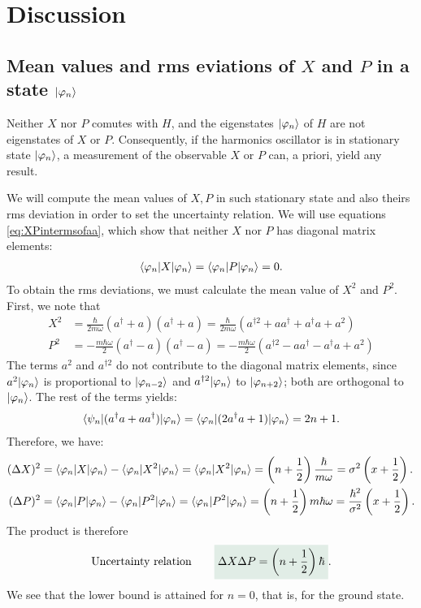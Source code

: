 \section{Discussion}


\subsection{Mean values and rms eviations of $X$ and $P$ in a state $|\varphi_n\rangle$}

Neither $X$ nor $P$ comutes with $H$, and the eigenstates $|\varphi_n\rangle$ of $H$ are not eigenstates of $X$ or $P$. Consequently, if the harmonics oscillator is in stationary state $|\varphi_n\rangle$,
a measurement of the observable $X$ or $P$ can, a priori, yield any result.


We will compute the mean values of $X,P$ in such stationary state and also theirs rms deviation in order to set the uncertainty relation. 
We will use equations \eqref{eq:XPintermsofaa}, which show that neither $X$ nor $P$ has diagonal matrix elements:
\begin{align}
    \langle\varphi_n|X|\varphi_n\rangle=\langle\varphi_n|P|\varphi_n\rangle=0.
\end{align}
To obtain the rms deviations, we must calculate the mean value of $X^2$ and $P^2$. First, we note that 
\begin{align*}
    X^2&=\frac{\hbar}{2m\omega}(a^\dagger+a)(a^\dagger+a)=\frac{\hbar}{2m\omega}(a^{\dagger 2}+aa^\dagger+a^\dagger a+a^2)\\
    P^2&=-\frac{m\hbar\omega}{2}(a^\dagger-a)(a^\dagger-a)=-\frac{m\hbar\omega}{2}(a^{\dagger2}-aa^\dagger-a^\dagger a+a^2)
\end{align*}
The terms $a^2$ and $a^{\dagger2}$ do not contribute to the diagonal matrix elements, since $a^2|\varphi_n\rangle$ is proportional to $|\varphi_{n-2}\rangle$ and 
$a^{\dagger2}|\varphi_n\rangle$ to $|\varphi_{n+2}\rangle$; both are orthogonal to $|\varphi_n\rangle$. The rest of the terms yields:
\begin{align*}
    \langle\psi_n|(a^\dagger a+aa^\dagger)|\varphi_n\rangle=\langle\varphi_n|(2a^\dagger a+1)|\varphi_n\rangle=2n+1.
\end{align*}
Therefore, we have:
\begin{align}
    (\Delta X)^2&=\langle\varphi_n|X|\varphi_n\rangle-\langle\varphi_n|X^2|\varphi_n\rangle=\langle\varphi_n|X^2|\varphi_n\rangle=\left(n+\frac{1}{2}\right)\frac{\hbar}{m\omega}=\sigma^2\left(x+\frac{1}{2}\right).\\
    (\Delta P)^2&=\langle\varphi_n|P|\varphi_n\rangle-\langle\varphi_n|P^2|\varphi_n\rangle=\langle\varphi_n|P^2|\varphi_n\rangle=\left(n+\frac{1}{2}\right)m\hbar\omega=\frac{\hbar^2}{\sigma^2}\left(x+\frac{1}{2}\right).
\end{align}
The product is therefore 
\begin{align}
    \text{Uncertainty relation}\qquad\highlight{\Delta X\Delta P=\left(n+\frac{1}{2}\right)\hbar}.
\end{align}
We see that the lower bound is attained for $n=0$, that is, for the ground state.


